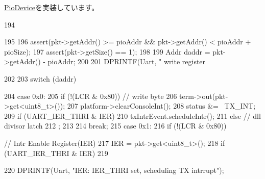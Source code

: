 \hyperlink{classPioDevice_afe8371668d023bb2516b286e5e399b6f}{PioDevice}を実装しています。


\begin{DoxyCode}
194 {
195 
196     assert(pkt->getAddr() >= pioAddr && pkt->getAddr() < pioAddr + pioSize);
197     assert(pkt->getSize() == 1);
198 
199     Addr daddr = pkt->getAddr() - pioAddr;
200 
201     DPRINTF(Uart, " write register %
      
202 
203     switch (daddr) {
204         case 0x0:
205             if (!(LCR & 0x80)) { // write byte
206                 term->out(pkt->get<uint8_t>());
207                 platform->clearConsoleInt();
208                 status &= ~TX_INT;
209                 if (UART_IER_THRI & IER)
210                     txIntrEvent.scheduleIntr();
211             } else { // dll divisor latch
212                ;
213             }
214             break;
215         case 0x1:
216             if (!(LCR & 0x80)) { // Intr Enable Register(IER)
217                 IER = pkt->get<uint8_t>();
218                 if (UART_IER_THRI & IER)
219                 {
220                     DPRINTF(Uart, "IER: IER_THRI set, scheduling TX intrrupt\n");
      
}}}}
\end{DoxyCode}
